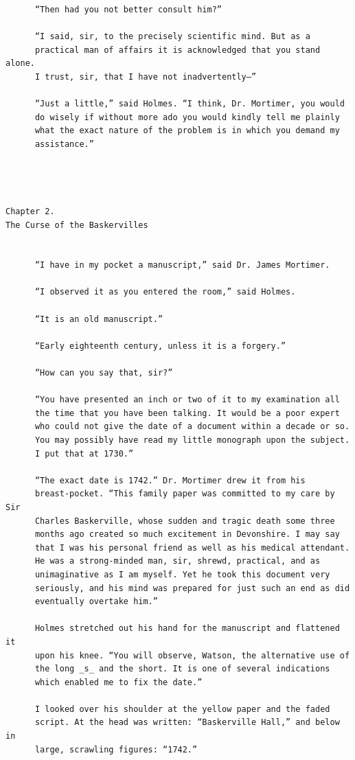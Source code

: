 \documentclass{article}
\begin{document}
\begin{verbatim}
      “Then had you not better consult him?”

      “I said, sir, to the precisely scientific mind. But as a
      practical man of affairs it is acknowledged that you stand alone.
      I trust, sir, that I have not inadvertently—”

      “Just a little,” said Holmes. “I think, Dr. Mortimer, you would
      do wisely if without more ado you would kindly tell me plainly
      what the exact nature of the problem is in which you demand my
      assistance.”




Chapter 2.
The Curse of the Baskervilles


      “I have in my pocket a manuscript,” said Dr. James Mortimer.

      “I observed it as you entered the room,” said Holmes.

      “It is an old manuscript.”

      “Early eighteenth century, unless it is a forgery.”

      “How can you say that, sir?”

      “You have presented an inch or two of it to my examination all
      the time that you have been talking. It would be a poor expert
      who could not give the date of a document within a decade or so.
      You may possibly have read my little monograph upon the subject.
      I put that at 1730.”

      “The exact date is 1742.” Dr. Mortimer drew it from his
      breast-pocket. “This family paper was committed to my care by Sir
      Charles Baskerville, whose sudden and tragic death some three
      months ago created so much excitement in Devonshire. I may say
      that I was his personal friend as well as his medical attendant.
      He was a strong-minded man, sir, shrewd, practical, and as
      unimaginative as I am myself. Yet he took this document very
      seriously, and his mind was prepared for just such an end as did
      eventually overtake him.”

      Holmes stretched out his hand for the manuscript and flattened it
      upon his knee. “You will observe, Watson, the alternative use of
      the long _s_ and the short. It is one of several indications
      which enabled me to fix the date.”

      I looked over his shoulder at the yellow paper and the faded
      script. At the head was written: “Baskerville Hall,” and below in
      large, scrawling figures: “1742.”


\end{verbatim}
\end{document}
